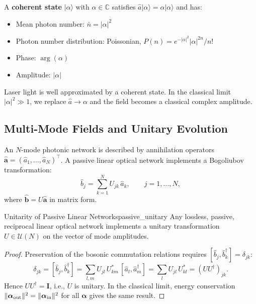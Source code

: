 \documentclass[12pt, a4paper]{article}
\newcommand{\CC}{\mathbb{C}}
\newcommand{\calU}{\mathcal{U}}
\newcommand{\id}{\mathbf{I}}
\begin{document}
A \textbf{coherent state} $|\alpha\rangle$ with $\alpha\in\CC$ satisfies
$\hat{a}|\alpha\rangle = \alpha|\alpha\rangle$ and has:
\begin{itemize}
  \item Mean photon number: $\bar{n} = |\alpha|^2$
  \item Photon number distribution: Poissonian,
    $P(n) = e^{-|\alpha|^2}|\alpha|^{2n}/n!$
  \item Phase: $\arg(\alpha)$
  \item Amplitude: $|\alpha|$
\end{itemize}
Laser light is well approximated by a coherent state.
In the classical limit $|\alpha|^2 \gg 1$, we replace $\hat{a}\to\alpha$
and the field becomes a classical complex amplitude.

\subsection{Multi-Mode Fields and Unitary Evolution}

An $N$-mode photonic network is described by annihilation operators
$\hat{\mathbf{a}} = (\hat{a}_1,\ldots,\hat{a}_N)^\top$.
A passive linear optical network implements a Bogoliubov transformation:
\begin{equation}
  \hat{b}_j = \sum_{k=1}^N U_{jk}\,\hat{a}_k, \qquad j=1,\ldots,N,
  \label{eq:bogoliubov}
\end{equation}
where $\hat{\mathbf{b}} = U\hat{\mathbf{a}}$ in matrix form.

\begin{theorem}{Unitarity of Passive Linear Networks}{passive_unitary}
  Any lossless, passive, reciprocal linear optical network implements
  a unitary transformation $U\in\calU(N)$ on the vector of mode amplitudes.
\end{theorem}
\begin{proof}
  Preservation of the bosonic commutation relations requires
  $[\hat{b}_j, \hat{b}_k^\dagger] = \delta_{jk}$:
  \begin{equation}
    \delta_{jk} = [\hat{b}_j, \hat{b}_k^\dagger]
    = \sum_{l,m} U_{jl}\,U_{km}^*\,[\hat{a}_l,\hat{a}_m^\dagger]
    = \sum_l U_{jl}\,U_{kl}^*
    = (UU^\dagger)_{jk}.
  \end{equation}
  Hence $UU^\dagger = \id$, i.e., $U$ is unitary.
  In the classical limit, energy conservation
  $\|\boldsymbol{\alpha}_{\rm out}\|^2 = \|\boldsymbol{\alpha}_{\rm in}\|^2$
  for all $\boldsymbol{\alpha}$ gives the same result.
\end{proof}
\end{document}
